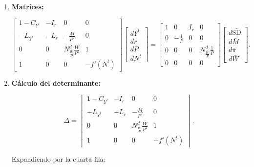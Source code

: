 \documentclass[
  doc,
  floatsintext,
  longtable,
  a4paper,
  nolmodern,
  notxfonts,
  notimes,
  12pt,
  colorlinks=true,linkcolor=blue,citecolor=blue,urlcolor=blue]{apa7}
\begin{document}
\begin{enumerate}
  \[
  \begin{aligned}
  (1 - C_{Y^t}) dY^t - I_r dr &= d\bar{\mathrm{SD}} + I_r d\bar{\pi}, \\
  -L_{Y^t} dY^t - L_r dr - \frac{\bar{M}}{P^2} dP &= -\frac{d\bar{M}}{P}, \\
  dN^t + N^d_{\frac{\bar{W}}{P}} \left( \frac{\bar{W}}{P^2} dP \right) &= N^d_{\frac{\bar{W}}{P}} \left( \frac{d\bar{W}}{P} \right), \\
  dY^t - f'(N^t) dN^t &= 0.
  \end{aligned}
  \]
\item
  \textbf{Matrices:}

  \[
  \begin{bmatrix}
  1 - C_{Y^t} & -I_r & 0 & 0 \\
  -L_{Y^t} & -L_r & -\frac{\bar{M}}{P^2} & 0 \\
  0 & 0 & N^d_{\frac{\bar{W}}{P}} \frac{\bar{W}}{P^2} & 1 \\
  1 & 0 & 0 & -f'(N^t)
  \end{bmatrix}
  \begin{bmatrix}
  dY^t \\
  dr \\
  dP \\
  dN^t
  \end{bmatrix}
  =
  \begin{bmatrix}
  1 & 0 & I_r & 0 \\
  0 & -\frac{1}{P} & 0 & 0 \\
  0 & 0 & 0 & N^d_{\frac{\bar{W}}{P}} \frac{1}{P} \\
  0 & 0 & 0 & 0
  \end{bmatrix}
  \begin{bmatrix}
  d\bar{\mathrm{SD}} \\
  d\bar{M} \\
  d\bar{\pi} \\
  d\bar{W}
  \end{bmatrix}.
  \]
\item
  \textbf{Cálculo del determinante:}

  \[
  \Delta = \begin{vmatrix}
  1 - C_{Y^t} & -I_r & 0 & 0 \\
  -L_{Y^t} & -L_r & -\frac{\bar{M}}{P^2} & 0 \\
  0 & 0 & N^d_{\frac{\bar{W}}{P}} \frac{\bar{W}}{P^2} & 1 \\
  1 & 0 & 0 & -f'(N^t)
  \end{vmatrix}.
  \]

  Expandiendo por la cuarta fila:


\end{enumerate}
\end{document}
